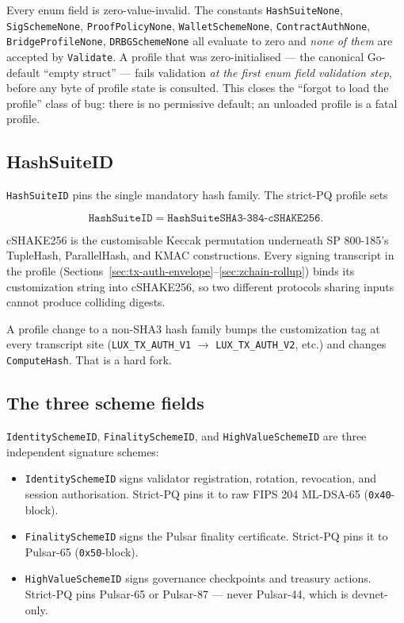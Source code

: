 Every enum field is zero-value-invalid. The constants
\texttt{HashSuiteNone}, \texttt{SigSchemeNone}, \texttt{ProofPolicyNone},
\texttt{WalletSchemeNone}, \texttt{ContractAuthNone},
\texttt{BridgeProfileNone}, \texttt{DRBGSchemeNone} all evaluate to zero and
\emph{none of them} are accepted by \texttt{Validate}. A profile that was
zero-initialised --- the canonical Go-default ``empty struct'' --- fails
validation \emph{at the first enum field validation step}, before any byte of
profile state is consulted. This closes the ``forgot to load the profile''
class of bug: there is no permissive default; an unloaded profile is a fatal
profile.

\subsection{HashSuiteID}

\texttt{HashSuiteID} pins the single mandatory hash family. The strict-PQ
profile sets

\[
  \texttt{HashSuiteID} = \texttt{HashSuiteSHA3-384-cSHAKE256}.
\]

cSHAKE256 \cite{sp800185} is the customisable Keccak permutation underneath
SP 800-185's TupleHash, ParallelHash, and KMAC constructions. Every signing
transcript in the profile (Sections~\ref{sec:tx-auth-envelope}--\ref{sec:zchain-rollup})
binds its customization string into cSHAKE256, so two different protocols
sharing inputs cannot produce colliding digests.

A profile change to a non-SHA3 hash family bumps the customization tag at
every transcript site (\texttt{LUX\_TX\_AUTH\_V1} $\to$ \texttt{LUX\_TX\_AUTH\_V2}, etc.)
and changes \texttt{ComputeHash}. That is a hard fork.

\subsection{The three scheme fields}

\texttt{IdentitySchemeID}, \texttt{FinalitySchemeID}, and
\texttt{HighValueSchemeID} are three independent signature schemes:

\begin{itemize}[leftmargin=2em,nosep]
  \item \texttt{IdentitySchemeID} signs validator registration, rotation,
    revocation, and session authorisation. Strict-PQ pins it to raw FIPS 204
    ML-DSA-65 (\texttt{0x40}-block).
  \item \texttt{FinalitySchemeID} signs the Pulsar finality certificate.
    Strict-PQ pins it to Pulsar-65 (\texttt{0x50}-block).
  \item \texttt{HighValueSchemeID} signs governance checkpoints and treasury
    actions. Strict-PQ pins Pulsar-65 or Pulsar-87 --- never
    Pulsar-44, which is devnet-only.
\end{itemize}

